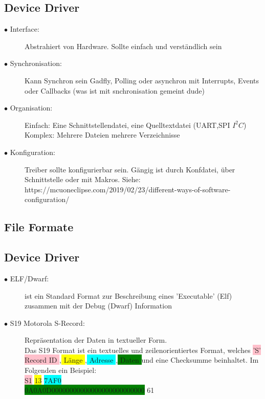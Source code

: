 \documentclass[a4paper, 8pt]{extarticle}
\begin{document}
\begin{multicols*}{3}
	\subsection{Device Driver}
			\begin{description}
		\item[$\bullet$ Interface:] Abstrahiert von Hardware. Sollte einfach und verständlich sein
		\item[$\bullet$ Synchronisation:] 
		Kann Synchron sein Gadfly, Polling oder asynchron mit Interrupts, Events oder Callbacks (was ist mit snchronisation gemeint dude)
		\item[$\bullet$ Organisation:]
		Einfach: Eine Schnittstellendatei, eine Quelltextdatei (UART,SPI $I^2C$)
		Komplex: Mehrere Dateien mehrere Verzeichnisse  
		\item[$\bullet$ Konfiguration:] Treiber sollte konfigurierbar sein. Gängig ist durch Konfdatei, über Schnittstelle oder mit Makros.
		Siehe:
		https://mcuoneclipse.com/2019/02/23/different-ways-of-software-configuration/
	\end{description}
	\subsection{File Formate}
		\subsection{Device Driver}
	\begin{description}
		\item[$\bullet$ ELF/Dwarf:] ist ein Standard Format zur Beschreibung eines ’Executable’
		(Elf) zusammen mit der Debug (Dwarf) Information
		\item[$\bullet$ S19 Motorola S-Record:] Repräsentation der Daten in textueller Form.\\
		Das S19 Format ist ein textuelles und zeilenorientiertes Format, welches
		\colorbox{pink}{’S’ Record ID },\colorbox{yellow}{ Länge },\colorbox{cyan}{ Adresse },\colorbox{green}{ Daten } und eine Checksumme beinhaltet.
		Im Folgenden ein Beispiel:\\
		\colorbox{pink}{S1} \colorbox{yellow}{13} \colorbox{cyan}{7AF0}\\ \colorbox{green}{0A0A0D00000000000000000000000000} 61


\end{description}
\end{multicols*}
\end{document}
